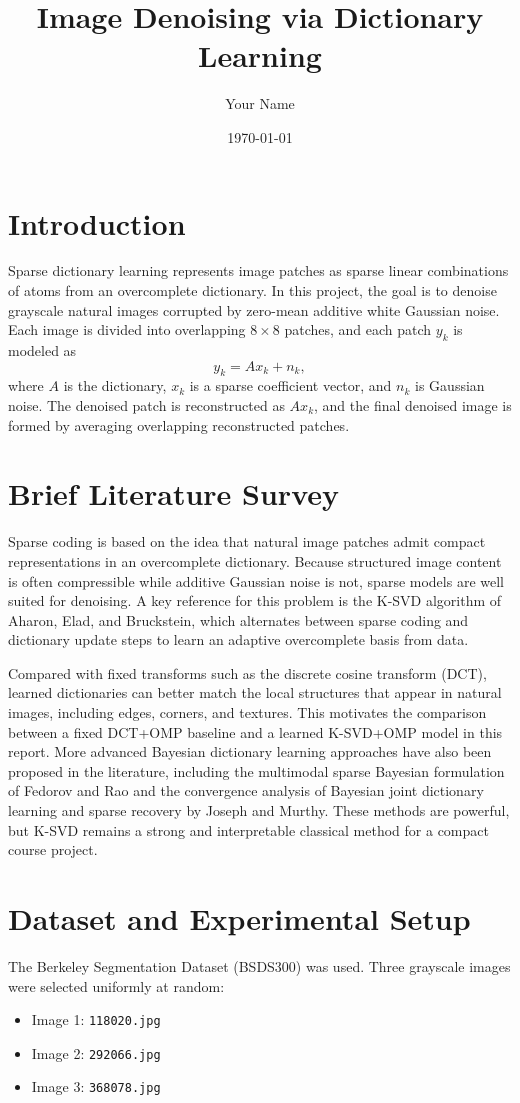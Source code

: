 \documentclass[11pt]{article}
\title{Image Denoising via Dictionary Learning}
\author{Your Name}
\date{\today}
\begin{document}
\maketitle

\section{Introduction}
Sparse dictionary learning represents image patches as sparse linear combinations of atoms from an overcomplete dictionary. In this project, the goal is to denoise grayscale natural images corrupted by zero-mean additive white Gaussian noise. Each image is divided into overlapping $8 \times 8$ patches, and each patch $y_k$ is modeled as
\[
y_k = A x_k + n_k,
\]
where $A$ is the dictionary, $x_k$ is a sparse coefficient vector, and $n_k$ is Gaussian noise. The denoised patch is reconstructed as $A x_k$, and the final denoised image is formed by averaging overlapping reconstructed patches.

\section{Brief Literature Survey}
Sparse coding is based on the idea that natural image patches admit compact representations in an overcomplete dictionary. Because structured image content is often compressible while additive Gaussian noise is not, sparse models are well suited for denoising. A key reference for this problem is the K-SVD algorithm of Aharon, Elad, and Bruckstein, which alternates between sparse coding and dictionary update steps to learn an adaptive overcomplete basis from data.

Compared with fixed transforms such as the discrete cosine transform (DCT), learned dictionaries can better match the local structures that appear in natural images, including edges, corners, and textures. This motivates the comparison between a fixed DCT+OMP baseline and a learned K-SVD+OMP model in this report. More advanced Bayesian dictionary learning approaches have also been proposed in the literature, including the multimodal sparse Bayesian formulation of Fedorov and Rao and the convergence analysis of Bayesian joint dictionary learning and sparse recovery by Joseph and Murthy. These methods are powerful, but K-SVD remains a strong and interpretable classical method for a compact course project.

\section{Dataset and Experimental Setup}
The Berkeley Segmentation Dataset (BSDS300) was used. Three grayscale images were selected uniformly at random:
\begin{itemize}
\item Image 1: \texttt{118020.jpg}
\item Image 2: \texttt{292066.jpg}
\item Image 3: \texttt{368078.jpg}
\end{itemize}
\end{document}
